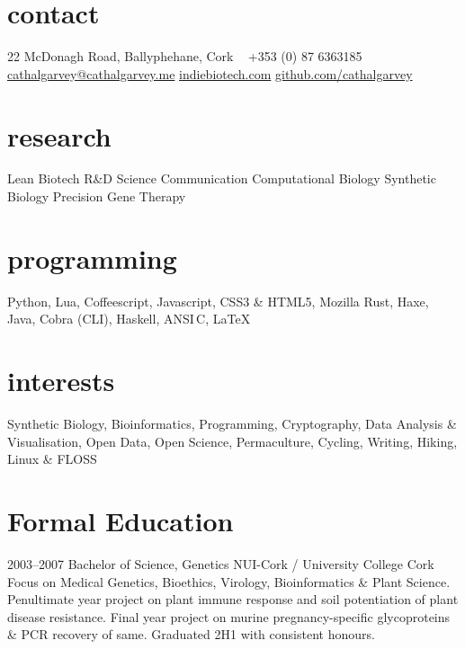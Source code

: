 \documentclass[]{friggeri-cv} %
\begin{document}


\begin{aside} %
\section{contact}
22 McDonagh Road,
Ballyphehane,
Cork
~
+353 (0) 87 6363185
~
\href{mailto:cathalgarvey@cathalgarvey.me}{cathalgarvey@cathalgarvey.me}
\href{http://www.indiebiotech.com}{indiebiotech.com}
\href{https://www.github.com/cathalgarvey}{github.com/cathalgarvey}
~
\section{research}
Lean Biotech R\&D
Science Communication
Computational Biology
Synthetic Biology
Precision Gene Therapy
~
\section{programming}
Python, Lua, Coffeescript, Javascript, CSS3 \& HTML5, Mozilla Rust, Haxe, Java, Cobra (CLI), Haskell, ANSI\,C, \LaTeX
~
\section{interests}
Synthetic Biology, Bioinformatics, Programming, Cryptography, Data Analysis \& Visualisation, Open Data, Open Science, Permaculture, Cycling, Writing, Hiking, Linux \& FLOSS
\end{aside}


\section{Formal Education}

\begin{entrylist}
\entry
{2003--2007}
{Bachelor of Science, Genetics}
{NUI-Cork / University College Cork}
{Focus on Medical Genetics, Bioethics, Virology, Bioinformatics \& Plant Science.
Penultimate year project on plant immune response and soil potentiation of plant
disease resistance. Final year project on murine pregnancy-specific glycoproteins \&
PCR recovery of same. Graduated 2H1 with consistent honours.
}

\end{entrylist}
\end{document}
